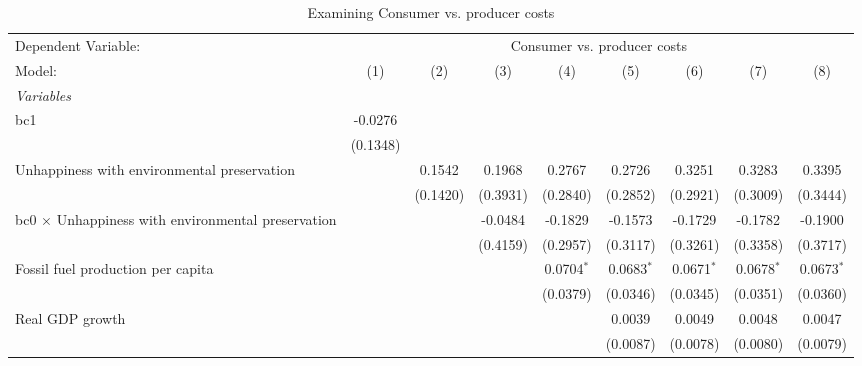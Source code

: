 
\begin{table}[htbp]
   \caption{Examining Consumer vs. producer costs}
   \centering
   \begin{tabular}{lcccccccc}
      \tabularnewline \midrule \midrule
      Dependent Variable: & \multicolumn{8}{c}{Consumer vs. producer costs}\\
      Model:                                                    & (1)      & (2)      & (3)      & (4)          & (5)          & (6)          & (7)          & (8)\\  
      \midrule
      \emph{Variables}\\
      bc1                                                       & -0.0276  &          &          &              &              &              &              &   \\   
                                                                & (0.1348) &          &          &              &              &              &              &   \\   
      Unhappiness with environmental preservation               &          & 0.1542   & 0.1968   & 0.2767       & 0.2726       & 0.3251       & 0.3283       & 0.3395\\   
                                                                &          & (0.1420) & (0.3931) & (0.2840)     & (0.2852)     & (0.2921)     & (0.3009)     & (0.3444)\\   
      bc0 $\times$ Unhappiness with environmental preservation  &          &          & -0.0484  & -0.1829      & -0.1573      & -0.1729      & -0.1782      & -0.1900\\   
                                                                &          &          & (0.4159) & (0.2957)     & (0.3117)     & (0.3261)     & (0.3358)     & (0.3717)\\   
      Fossil fuel production per capita                         &          &          &          & 0.0704$^{*}$ & 0.0683$^{*}$ & 0.0671$^{*}$ & 0.0678$^{*}$ & 0.0673$^{*}$\\   
                                                                &          &          &          & (0.0379)     & (0.0346)     & (0.0345)     & (0.0351)     & (0.0360)\\   
      Real GDP growth                                           &          &          &          &              & 0.0039       & 0.0049       & 0.0048       & 0.0047\\   
                                                                &          &          &          &              & (0.0087)     & (0.0078)     & (0.0080)     & (0.0079)\\   

\end{tabular}
\end{table}
